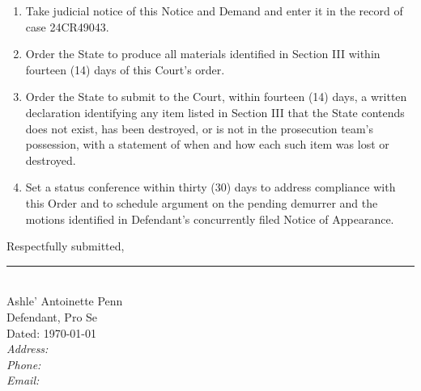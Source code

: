 \documentclass[12pt,letterpaper]{extarticle}
\begin{document}
	\begin{enumerate}[leftmargin=0.5in, label=\arabic*., itemsep=4pt]
		
		\item Take judicial notice of this Notice and Demand and enter it in the record
		of case 24CR49043.
		
		\item Order the State to produce all materials identified in Section III within
		fourteen (14) days of this Court's order.
		
		\item Order the State to submit to the Court, within fourteen (14) days, a written
		declaration identifying any item listed in Section III that the State contends does
		not exist, has been destroyed, or is not in the prosecution team's possession,
		with a statement of when and how each such item was lost or destroyed.
		
		\item Set a status conference within thirty (30) days to address compliance with
		this Order and to schedule argument on the pending demurrer and the motions
		identified in Defendant's concurrently filed Notice of Appearance.
		
	\end{enumerate}
	
	\vspace{24pt}
	\noindent\hspace{0.5in}Respectfully submitted,
	
	\vspace{48pt}
	\noindent\hspace{0.5in}\rule{2.5in}{0.4pt}\\[4pt]
	\noindent\hspace{0.5in}Ashle' Antoinette Penn\\
	\noindent\hspace{0.5in}Defendant, Pro Se\\[6pt]
	\noindent\hspace{0.5in}Dated: \today\\[6pt]
	\noindent\hspace{0.5in}\textit{Address:} \underline{\hspace{2.2in}}\\[4pt]
	\noindent\hspace{0.5in}\textit{Phone:} \underline{\hspace{2.2in}}\\[4pt]
	\noindent\hspace{0.5in}\textit{Email:} \underline{\hspace{2.2in}}
	
\end{document}
